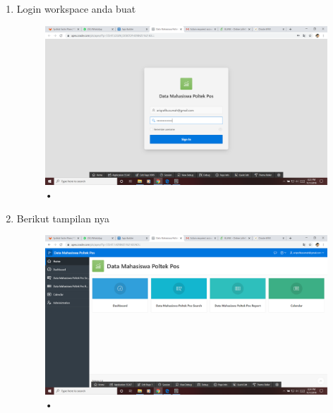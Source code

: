 \documentclass[12pt, times new roman, a4paper]{article}
\begin{document}
\begin{enumerate}
\\
\\
\\
\\
\\
\\
\\
\\
\\
\\
\\
\\
\item Login workspace anda buat
\begin{figure}[h]
	\centering
		\includegraphics[scale=0.2]{Gambar/Capture15}
	\caption{•}
\end{figure}
\item Berikut tampilan nya
\begin{figure}[h]
	\centering
		\includegraphics[scale=0.2]{Gambar/Capture16}
	\caption{•}
\end{figure}
\\
\\
\\
\\

\end{enumerate}
\end{document}
